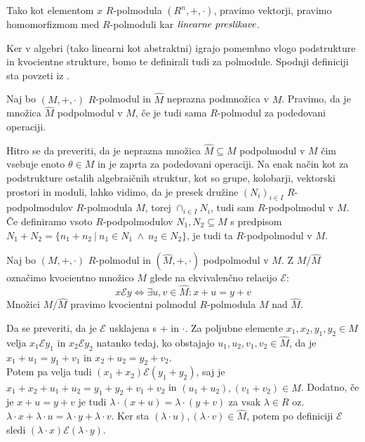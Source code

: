 \documentclass[mat1]{fmfdelo}
\newcommand{\pojem}[1]{\ensuremath{\emph{#1}}}
\begin{document}
\begin{opomba}
	Tako kot elementom $x$ $R$-polmodula $(R^n, +, \cdot)$, pravimo vektorji, pravimo homomorfizmom med $R$-polmoduli kar \pojem{linearne preslikave}.
\end{opomba}

Ker v algebri (tako linearni kot abstraktni) igrajo pomembno vlogo podstrukture in kvocientne strukture, bomo te definirali tudi za polmodule. Spodnji definiciji sta povzeti iz \cite{bib:Gondran}.

\begin{definicija}
	Naj bo $(M, +, \cdot)$ $R$-polmodul in $\widehat{M}$ neprazna podmnožica v $M$. Pravimo, da je množica $\widehat{M}$ podpolmodul v $M$, če je tudi sama $R$-polmodul za podedovani operaciji.
\end{definicija}
Hitro se da preveriti, da je neprazna množica $\widehat{M}\subseteq M$ podpolmodul v $M$ čim vsebuje enoto $\theta\in M$ in je zaprta za podedovani operaciji.
Na enak način kot za podstrukture ostalih algebraičnih struktur, kot so grupe, kolobarji, vektorski prostori in moduli, lahko vidimo, da je presek družine $(N_i)_{i\in I}$ $R$-podpolmodulov $R$-polmodula $M$, torej $\cap_{i\in I}N_i$, tudi sam $R$-podpolmodul v $M$. Če definiramo vsoto $R$-podpolmodulov $N_1,N_2\subseteq M$ s predpisom $N_1 + N_2 =\{n_1 + n_2~|~n_1\in N_1~\land~n_2\in N_2\}$, je tudi ta $R$-podpolmodul v $M$.

\begin{definicija}
	Naj bo $(M, +, \cdot)$ $R$-polmodul in $(\widehat{M}, +, \cdot)$ podpolmodul v $M$. Z $M/ \widehat{M}$ označimo kvocientno množico $M$ glede na ekvivalenčno relacijo $\mathcal{E}$: $$x\mathcal{E}y \iff \exists u, v\in\widehat{M}: x + u = y + v$$ Množici $M/\widehat{M}$ pravimo kvocientni polmodul $R$-polmodula $M$ nad $\widehat{M}$.
\end{definicija}

Da se preveriti, da je $\mathcal{E}$ usklajena s $+$ in $\cdot$. Za poljubne elemente $x_1, x_2, y_1, y_2 \in M$ velja $x_1\mathcal{E}y_1$ in $x_2\mathcal{E}y_2$ natanko tedaj, ko obstajajo $u_1, u_2, v_1, v_2 \in \widehat{M}$, da je $x_1 + u_1 = y_1 + v_1$ in $ x_2 + u_2 = y_2 + v_2$. \\

Potem pa velja tudi $(x_1 + x_2)\mathcal{E}(y_1 + y_2)$, saj je $x_1 + x_2 + u_1 + u_2 = y_1 + y_2 + v_1 + v_2$ in $(u_1 + u_2), (v_1 + v_2)\in \widehat{M}$. Dodatno, če je $x + u = y + v$ je tudi $\lambda\cdot (x + u) = \lambda\cdot (y + v)$ za vsak $\lambda\in R$ oz. $\lambda\cdot x + \lambda\cdot u = \lambda\cdot y + \lambda\cdot v$. Ker sta $(\lambda\cdot u), (\lambda\cdot v)\in \widehat{M}$, potem po definiciji $\mathcal{E}$ sledi $(\lambda\cdot x) \mathcal{E} (\lambda\cdot y)$.
\end{document}

